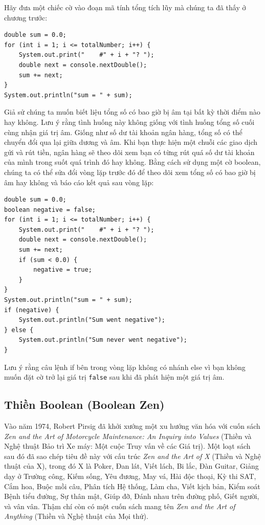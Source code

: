 Hãy đưa một chiếc cờ vào đoạn mã tính tổng tích lũy mà chúng ta đã thấy ở chương trước:

\begin{verbatim}
double sum = 0.0;
for (int i = 1; i <= totalNumber; i++) {
    System.out.print("    #" + i + "? ");
    double next = console.nextDouble();
    sum += next;
}
System.out.println("sum = " + sum);
\end{verbatim}

Giả sử chúng ta muốn biết liệu tổng số có bao giờ bị âm tại bất kỳ thời điểm nào hay không. Lưu ý rằng tình huống này không giống với tình huống tổng số cuối cùng nhận giá trị âm. Giống như số dư tài khoản ngân hàng, tổng số có thể chuyển đổi qua lại giữa dương và âm. Khi bạn thực hiện một chuỗi các giao dịch gửi và rút tiền, ngân hàng sẽ theo dõi xem bạn có từng rút quá số dư tài khoản của mình trong suốt quá trình đó hay không. Bằng cách sử dụng một cờ boolean, chúng ta có thể sửa đổi vòng lặp trước đó để theo dõi xem tổng số có bao giờ bị âm hay không và báo cáo kết quả sau vòng lặp:

\begin{verbatim}
double sum = 0.0;
boolean negative = false;
for (int i = 1; i <= totalNumber; i++) {
    System.out.print("    #" + i + "? ");
    double next = console.nextDouble();
    sum += next;
    if (sum < 0.0) {
        negative = true;
    }
}
System.out.println("sum = " + sum);
if (negative) {
    System.out.println("Sum went negative");
} else {
    System.out.println("Sum never went negative");
}
\end{verbatim}

Lưu ý rằng câu lệnh if bên trong vòng lặp không có nhánh else vì bạn không muốn đặt cờ trở lại giá trị \texttt{false} sau khi đã phát hiện một giá trị âm.

\subsection*{Thiền Boolean (Boolean Zen)}

Vào năm 1974, Robert Pirsig đã khởi xướng một xu hướng văn hóa với cuốn sách \textit{Zen and the Art of Motorcycle Maintenance: An Inquiry into Values} (Thiền và Nghệ thuật Bảo trì Xe máy: Một cuộc Truy vấn về các Giá trị). Một loạt sách sau đó đã sao chép tiêu đề này với cấu trúc \textit{Zen and the Art of X} (Thiền và Nghệ thuật của X), trong đó X là Poker, Đan lát, Viết lách, Bi lắc, Đàn Guitar, Giảng dạy ở Trường công, Kiếm sống, Yêu đương, May vá, Hài độc thoại, Kỳ thi SAT, Cắm hoa, Buộc mồi câu, Phân tích Hệ thống, Làm cha, Viết kịch bản, Kiểm soát Bệnh tiểu đường, Sự thân mật, Giúp đỡ, Đánh nhau trên đường phố, Giết người, và vân vân. Thậm chí còn có một cuốn sách mang tên \textit{Zen and the Art of Anything} (Thiền và Nghệ thuật của Mọi thứ).


